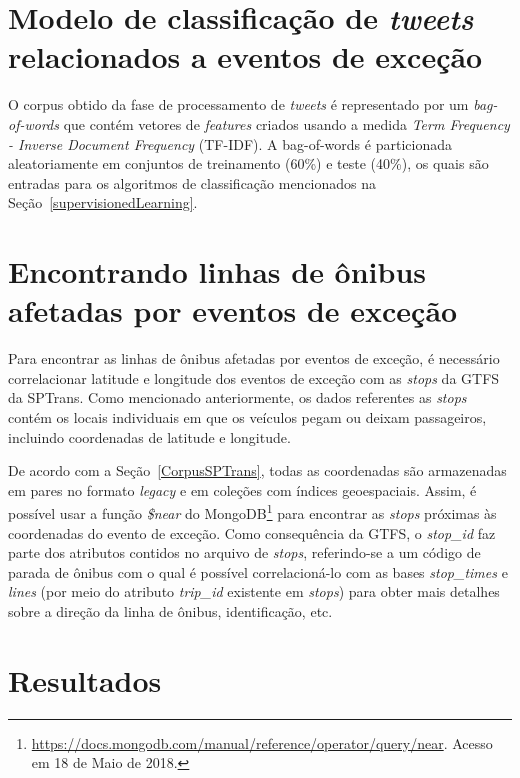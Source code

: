 \documentclass[
	12pt,				%
	oneside,			%
	a4paper,			%
	english,			%
	brazil				%
	]{abntex2ppgsi}
\begin{document}
{{{\section{Modelo de classificação de \textit{tweets} relacionados a eventos de exceção}
\label{model}

O corpus obtido da fase de processamento de \textit {tweets} é representado por um \textit{bag-of-words} que contém vetores de \textit{features} criados usando a medida \textit{Term Frequency - Inverse Document Frequency} (TF-IDF). A bag-of-words é particionada aleatoriamente em conjuntos de treinamento (60\%) e teste (40\%), os quais são entradas para os algoritmos de classificação mencionados na Seção~\ref{supervisionedLearning}.

\section{Encontrando linhas de ônibus afetadas por eventos de exceção}

Para encontrar as linhas de ônibus afetadas por eventos de exceção, é necessário correlacionar latitude e longitude dos eventos de exceção com as \textit{stops} da GTFS da SPTrans. Como mencionado anteriormente, os dados referentes as \textit{stops} contém os locais individuais em que os veículos pegam ou deixam passageiros, incluindo coordenadas de latitude e longitude.

De acordo com a Seção~\ref{CorpusSPTrans}, todas as coordenadas são armazenadas em pares no formato \textit{legacy} e em coleções com índices geoespaciais. Assim, é possível usar a função \textit{\$near} do MongoDB\footnote {\url{https://docs.mongodb.com/manual/reference/operator/query/near}. Acesso em 18 de Maio de 2018.} para encontrar as \textit{stops} próximas às coordenadas do evento de exceção. Como consequência da GTFS, o \textit{stop\_id} faz parte dos atributos contidos no arquivo de \textit{stops}, referindo-se a um código de parada de ônibus com o qual é possível correlacioná-lo com as bases \textit{stop\_times} e \textit{lines} (por meio do atributo \textit{trip\_id} existente em \textit{stops}) para obter mais detalhes sobre a direção da linha de ônibus, identificação, etc.

\section{Resultados}
	
}}}
\end{document}
